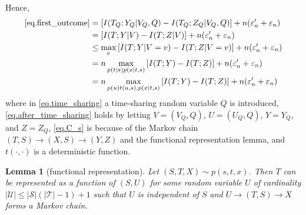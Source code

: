 \documentclass[12pt, Draft, onecolumn]{IEEEtran}
\def\calS{{\mathcal{S}}}
\def\calU{{\mathcal{U}}}
\def\calT{{\mathcal{T}}}
\newtheorem{lemma}{Lemma}
\begin{document}

Hence,
\begin{align}
\eqref{eq.first_outcome}
\label{eq.time_sharing}
&= \left[I(T_Q;Y_Q|V_Q,Q)-I(T_Q;Z_Q|V_Q,Q)\right]+n(\varepsilon_n'+\varepsilon_n)\\
\label{eq.after_time_sharing}
&= \left[I(T;Y|V)-I(T;Z|V)\right]+n(\varepsilon_n'+\varepsilon_n)\\
&\leq \max_v \left[I(T;Y|V=v)-I(T;Z|V=v)\right]+n(\varepsilon_n'+\varepsilon_n)\notag\\
\label{eq.C_s}
&= n\max_{p(t|s)p(x|t,s)}\left[I(T;Y)-I(T;Z)\right]+n(\varepsilon_n'+\varepsilon_n)\notag\\
&= n\max_{p(u)t(u,s),p(x|t,s)}\left[I(T;Y)-I(T;Z)\right]+n(\varepsilon_n'+\varepsilon_n)
\end{align}
where in \eqref{eq.time_sharing} a time-sharing random variable $Q$ is introduced, \eqref{eq.after_time_sharing} holds by letting $V = (V_Q,Q)$, $U=(U_Q,Q)$, $Y=Y_Q$, and $Z=Z_Q$, \eqref{eq.C_s} is because of the Markov chain $(T,S)\rightarrow (X,S)\rightarrow (Y,Z)$ and the functional representation lemma, and $t(\cdot,\cdot)$ is a deterministic function. 

\begin{lemma}[functional representation]
Let $(S,T,X)\sim p(s,t,x)$. Then $T$ can be represented as a function of $(S,U)$ for some random variable $U$ of cardinality $|\calU|\leq |\calS|(|\calT|-1)+1$ such that $U$ is independent of $S$ and $U\rightarrow (T,S)\rightarrow X$ forms a Markov chain.
\end{lemma}




%
%
\end{document}
